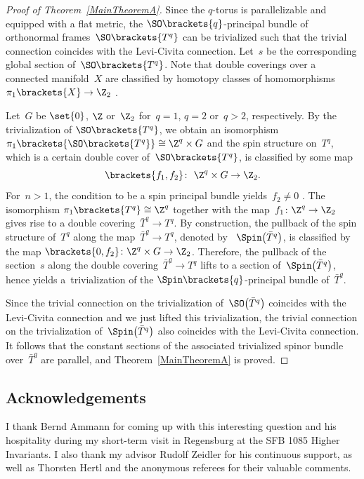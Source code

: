 \documentclass[10pt,a4paper]{amsart}
\numberwithin{equation}{section}
\begin{document}
\begin{proof}[Proof of Theorem~\ref{MainTheoremA}]
Since the $q$-torus is parallelizable and equipped with a flat metric, the $\SO\brackets{q}$-principal bundle of orthonormal frames~$\SO\brackets{T^q}$ can be trivialized such that the trivial connection coincides with the Levi-Civita connection. Let~$s$ be the corresponding global section of~$\SO\brackets{T^q}$. Note that double coverings over a connected manifold~$X$ are classified by homotopy classes of homomorphisms~${\pi_1\brackets{X}\to \Z_2}$ \cite[Section 1.3]{Hatcher2001}.

Let~$G$ be $\set{0}$, $\Z$ or~$\Z_2$ for~$q=1$, $q=2$ or~$q>2$, respectively. By the trivialization of $\SO\brackets{T^q}$, we obtain an isomorphism $\pi_1\brackets{\SO\brackets{T^q}}\cong \Z^q\times G$ and the spin structure on~$T^q$, which is a certain double cover of~$\SO\brackets{T^q}$, is classified by some map
\[
 \brackets{f_1,f_2}\colon\ \Z^q\times G \to \Z_2.
\]
For~$n>1$, the condition to be a spin principal bundle yields~$f_2\neq 0$ \cite[Section~1, Corollary 1.5]{Lawson1989}.
The isomorphism $\pi_1\brackets{T^q}\cong \Z^q$ together with the map~$f_1\colon \Z^q \to \Z_2$ gives rise to a double covering~$\bar{T}^q \to T^q$. By construction, the pullback of the spin structure of~$T^q$ along the map~${\bar{T}^q\to T^q}$, denoted by ~$\Spin\bigl(\bar{T}^q\bigr)$, is classified by the map $\brackets{0,f_2}\colon \Z^q\times G \to \Z_2$. Therefore, the pullback of the section~$s$ along the double covering~$\bar{T}^q\to T^q$ lifts to a section of~$\Spin\bigl(\bar{T}^q\bigr)$, hence yields a~trivialization of the $\Spin\brackets{q}$-principal bundle of~$\bar{T}^q$.

Since the trivial connection on the trivialization of~$\SO\bigl(\bar{T}^q\bigr)$ coincides with the Levi-Civita connection and we just lifted this trivialization, the trivial connection on the trivialization of~$\Spin\bigl(\bar{T}^q\bigr)$ also coincides with the Levi-Civita connection. It follows that the constant sections of the associated trivialized spinor bundle over~$\bar{T}^q$ are parallel, and Theorem~\ref{MainTheoremA} is proved.
\end{proof}


\subsection*{Acknowledgements}

I thank Bernd Ammann for coming up with this interesting question and his hospitality during my short-term visit in Regensburg at the SFB 1085 Higher Invariants. I also thank my advisor Rudolf Zeidler for his continuous support, as well as Thorsten Hertl and the anonymous referees for their valuable comments.
\end{document}
